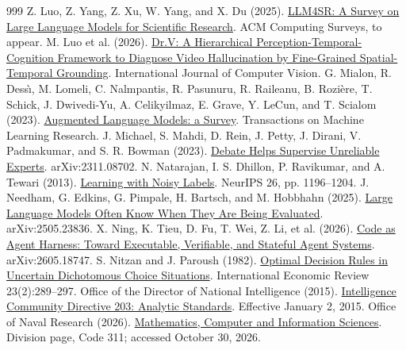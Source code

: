 \documentclass[12pt,letterpaper]{article}
\begin{document}
\begin{thebibliography}{999}
 Z. Luo, Z. Yang, Z. Xu, W. Yang, and X. Du (2025). \href{https://arxiv.org/abs/2501.04306}{LLM4SR: A Survey on Large Language Models for Scientific Research}. ACM Computing Surveys, to appear.
 M. Luo et al. (2026). \href{https://arxiv.org/abs/2509.11866}{Dr.V: A Hierarchical Perception-Temporal-Cognition Framework to Diagnose Video Hallucination by Fine-Grained Spatial-Temporal Grounding}. International Journal of Computer Vision.
 G. Mialon, R. Dess\`{\i}, M. Lomeli, C. Nalmpantis, R. Pasunuru, R. Raileanu, B. Rozi\`{e}re, T. Schick, J. Dwivedi-Yu, A. Celikyilmaz, E. Grave, Y. LeCun, and T. Scialom (2023). \href{https://arxiv.org/abs/2302.07842}{Augmented Language Models: a Survey}. Transactions on Machine Learning Research.
 J. Michael, S. Mahdi, D. Rein, J. Petty, J. Dirani, V. Padmakumar, and S. R. Bowman (2023). \href{https://arxiv.org/abs/2311.08702}{Debate Helps Supervise Unreliable Experts}. arXiv:2311.08702.
 N. Natarajan, I. S. Dhillon, P. Ravikumar, and A. Tewari (2013). \href{https://papers.nips.cc/paper/5073-learning-with-noisy-labels}{Learning with Noisy Labels}. NeurIPS 26, pp. 1196--1204.
 J. Needham, G. Edkins, G. Pimpale, H. Bartsch, and M. Hobbhahn (2025). \href{https://arxiv.org/abs/2505.23836}{Large Language Models Often Know When They Are Being Evaluated}. arXiv:2505.23836.
 X. Ning, K. Tieu, D. Fu, T. Wei, Z. Li, et al. (2026). \href{https://arxiv.org/abs/2605.18747}{Code as Agent Harness: Toward Executable, Verifiable, and Stateful Agent Systems}. arXiv:2605.18747.
 S. Nitzan and J. Paroush (1982). \href{https://doi.org/10.2307/2526438}{Optimal Decision Rules in Uncertain Dichotomous Choice Situations}. International Economic Review 23(2):289--297.
 Office of the Director of National Intelligence (2015). \href{https://www.dni.gov/files/documents/ICD/ICD-203.pdf}{Intelligence Community Directive 203: Analytic Standards}. Effective January 2, 2015.
 Office of Naval Research (2026). \href{https://www.onr.navy.mil/organization/departments/code-31/division-311}{Mathematics, Computer and Information Sciences}. Division page, Code 311; accessed October 30, 2026.

\end{thebibliography}
\end{document}
